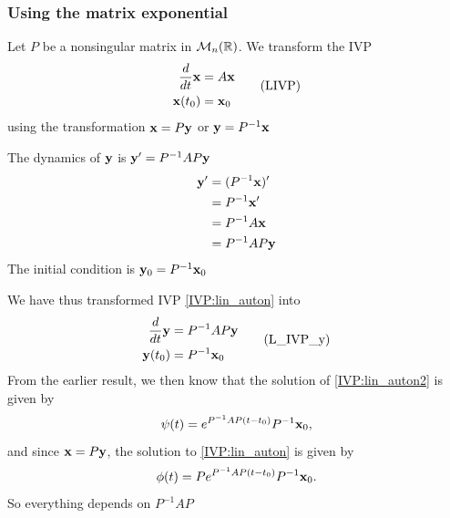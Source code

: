 \documentclass[aspectratio=169]{beamer}
\begin{document}
\begin{frame}\frametitle{Using the matrix exponential}
Let $P$ be a nonsingular matrix in $\mathcal{M}_n(\mathbb{R})$. We transform the IVP
\begin{equation}\label{IVP:lin_auton}
\begin{aligned}
\frac{d}{dt}\mathbf{x} &= A\mathbf{x}\\
\mathbf{x}(t_0)&=\mathbf{x}_0
\end{aligned}\tag{LIVP}
\end{equation}
using the transformation $\mathbf{x}=P\mathbf{y}$ or $\mathbf{y}=P^{-1}\mathbf{x}$
\end{frame}

\begin{frame}
The dynamics of $\mathbf{y}$ is $\mathbf{y}'=P^{-1}AP\mathbf{y}$
\begin{align*}
\mathbf{y}' &= (P^{-1}\mathbf{x})' \\
&= P^{-1}\mathbf{x}' \\
&= P^{-1}A\mathbf{x} \\
&= P^{-1}AP\mathbf{y}
\end{align*}
\vfill
The initial condition is $\mathbf{y}_0=P^{-1}\mathbf{x}_0$
\end{frame}

\begin{frame}
We have thus transformed IVP \eqref{IVP:lin_auton} into
\begin{equation}\label{IVP:lin_auton2}
\begin{aligned}
\frac{d}{dt}\mathbf{y} &= P^{-1}AP\mathbf{y}\\
\mathbf{y}(t_0)&=P^{-1}\mathbf{x}_0
\end{aligned}\tag{L\_IVP\_y}
\end{equation}
From the earlier result, we then know that the solution of \eqref{IVP:lin_auton2} is given by
\[
\psi(t)=e^{P^{-1}AP(t-t_0)}P^{-1}\mathbf{x}_0,
\]
and since $\mathbf{x}=P\mathbf{y}$, the solution to \eqref{IVP:lin_auton} is given by
\[
\phi(t)=Pe^{P^{-1}AP(t-t_0)}P^{-1}\mathbf{x}_0.
\]
So everything depends on $P^{-1}AP$
\end{frame}

\end{document}
